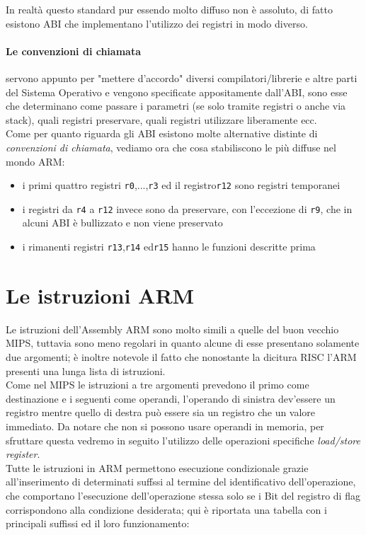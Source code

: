\documentclass[class=book, crop=false, oneside]{standalone}
\begin{document}
In realtà questo standard pur essendo molto diffuso non è assoluto, di fatto esistono ABI che implementano l'utilizzo dei registri in modo diverso.\\

\paragraph{Le convenzioni di chiamata} servono appunto per "mettere d'accordo" diversi compilatori/librerie e altre parti del Sistema Operativo e vengono specificate appositamente dall'ABI, sono esse che determinano come passare i parametri (se solo tramite registri o anche via stack), quali registri preservare, quali registri utilizzare liberamente ecc.\\
Come per quanto riguarda gli ABI esistono molte alternative distinte di \emph{convenzioni di chiamata}, vediamo ora che cosa stabiliscono le più diffuse nel mondo ARM:

\begin{itemize}[nolistsep]
	\item i primi quattro registri \texttt{r0},...,\texttt{r3} ed il registro\texttt{r12} sono registri temporanei
	\item i registri da \texttt{r4} a \texttt{r12} invece sono da preservare, con l'eccezione di \texttt{r9}, che in alcuni ABI è bullizzato e non viene preservato
	\item i rimanenti registri \texttt{r13},\texttt{r14} ed\texttt{r15} hanno le funzioni descritte prima
\end{itemize}

\section{Le istruzioni ARM}
Le istruzioni dell'Assembly ARM sono molto simili a quelle del buon vecchio MIPS, tuttavia sono meno regolari in quanto alcune di esse presentano solamente due argomenti; è inoltre notevole il fatto che nonostante la dicitura RISC l'ARM presenti una lunga lista di istruzioni.\\
Come nel MIPS le istruzioni a tre argomenti prevedono il primo come destinazione e i seguenti come operandi, l'operando di sinistra dev'essere un registro mentre quello di destra può essere sia un registro che un valore immediato. Da notare che non si possono usare operandi in memoria, per sfruttare questa vedremo in seguito l'utilizzo delle operazioni specifiche \emph{load/store register}.\\
Tutte le istruzioni in ARM permettono esecuzione condizionale grazie all'inserimento di determinati suffssi al termine del identificativo dell'operazione, che comportano l'esecuzione dell'operazione stessa solo se i Bit del registro di flag corrispondono alla condizione desiderata; qui è riportata una tabella con i principali suffissi ed il loro funzionamento:\\
\end{document}
